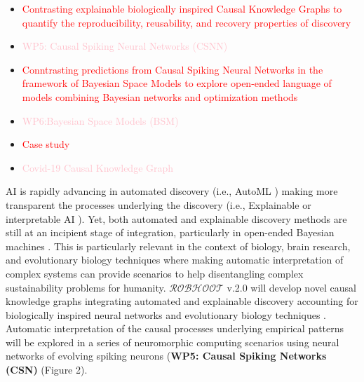 \documentclass[12pt, a4paper]{article} %
\begin{document}
  \begin{itemize}
  \item \textcolor{red}{Contrasting explainable biologically inspired
      Causal Knowledge Graphs to quantify the reproducibility,
      reusability, and recovery properties of discovery}
   \item \textcolor{pink}{WP5: Causal Spiking Neural Networks (CSNN)}
   \item \textcolor{red}{Conntrasting predictions from Causal Spiking
       Neural Networks in the framework of Bayesian Space Models to
       explore open-ended language of models combining Bayesian
       networks and optimization methods}
   \item \textcolor{pink}{WP6:Bayesian Space Models (BSM)}
   \item \textcolor{red}{Case study}
   \item \textcolor{pink}{Covid-19 Causal Knowledge Graph}
   \end{itemize}

   AI is rapidly advancing in automated discovery (i.e., AutoML
   \citep{Real2020}) making more transparent the processes underlying
   the discovery (i.e., Explainable or interpretable AI
   \citep{Gil2019,Futia2020}). Yet, both automated and explainable
   discovery methods are still at an incipient stage of integration,
   particularly in open-ended Bayesian machines
   \citep{Guimera2020}. This is particularly relevant in the context
   of biology, brain research, and evolutionary biology techniques
   where making automatic interpretation of complex systems can
   provide scenarios to help disentangling complex sustainability
   problems for humanity. $\mathcal{ROBHOOT}$ v.2.0 will develop novel
   causal knowledge graphs integrating automated and explainable
   discovery accounting for biologically inspired neural networks and
   evolutionary biology techniques
   \citep{Maass2014,Maass2015}. Automatic interpretation of the causal
   processes underlying empirical patterns will be explored in a
   series of neuromorphic computing scenarios using neural networks of
   evolving spiking neurons ({\bf WP5: Causal Spiking Networks (CSN)}
   (Figure 2).
\end{document}
